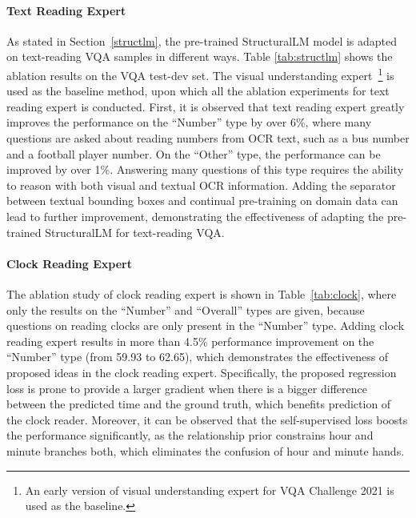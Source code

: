\paragraph{Text Reading Expert}
As stated in Section~\ref{structlm}, the pre-trained StructuralLM model is adapted on text-reading VQA samples in different ways. Table \ref{tab:structlm} shows the ablation results on the VQA test-dev set. The visual understanding expert~\footnote{\small An early version of visual understanding expert for VQA Challenge 2021 is used as the baseline.} is used as the baseline method, upon which all the ablation experiments for text reading expert is conducted. First, it is observed that text reading expert greatly improves the performance on the ``Number'' type by over 6\%, where many questions are asked about reading numbers from OCR text, such as a bus number and a football player number. On the ``Other'' type, the performance can be improved by over 1\%. Answering many questions of this type requires the ability to reason with both visual and textual OCR information. Adding the separator between textual bounding boxes and continual pre-training on domain data can lead to further improvement, demonstrating the effectiveness of adapting the pre-trained StructuralLM for text-reading VQA. 


\paragraph{Clock Reading Expert}
The ablation study of clock reading expert is shown in Table~\ref{tab:clock}, where only the results on the ``Number'' and ``Overall'' types are given, because questions on reading clocks are only present in the ``Number'' type. Adding clock reading expert results in more than 4.5\% performance improvement on the ``Number'' type (from 59.93 to 62.65), which demonstrates the effectiveness of proposed ideas in the clock reading expert.
Specifically, the proposed regression loss is prone to provide a larger gradient when there is a bigger difference between the predicted time and the ground truth, which benefits prediction of the clock reader. Moreover, it can be observed that the self-supervised loss boosts the performance significantly, as the relationship prior constrains hour and minute branches both, which eliminates the confusion of hour and minute hands.

